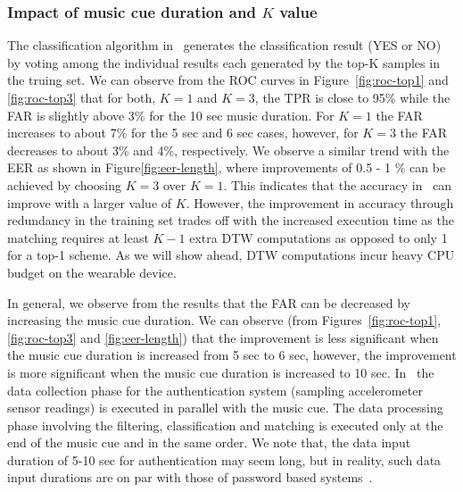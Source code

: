 \subsubsection{Impact of music cue duration and $K$ value}

The classification algorithm in \systemname~generates the classification result (YES or NO) by voting among the individual results each generated by the top-K samples in the truing set. We can observe from the ROC curves in Figure~\ref{fig:roc-top1} and \ref{fig:roc-top3} that 
for both, $K=1$ and $K=3$, the TPR is close to 95\% while the FAR is slightly 
above 3\% for the 10 sec music duration. For $K = 1$ the FAR increases to 
about 7\% for the 5 sec and 6 sec cases, however, for $K = 3$ the FAR 
decreases to about 3\% and 4\%, respectively. 
We observe a similar trend with the EER as shown in 
Figure\ref{fig:eer-length}, where improvements of 0.5 - 1 \% 
can be achieved by choosing $K = 3$ over $K = 1$.
This indicates that the accuracy in \systemname~can improve with a larger 
value of $K$. However, the improvement in accuracy through redundancy in the 
training set trades off with the increased execution time as the 
matching requires at least $K - 1$  extra DTW computations as opposed to only 
1 for a top-1 scheme. As we will show ahead, DTW computations incur heavy CPU 
budget on the wearable device. 

In general, we observe from the results that the FAR can 
be decreased by increasing the music cue duration. 
We can observe (from Figures~\ref{fig:roc-top1}, \ref{fig:roc-top3} and 
\ref{fig:eer-length}) that the improvement is less significant when the music 
cue duration is increased from 5 sec to 6 sec, however, the improvement is 
more 
significant when the music cue duration is increased to 10 sec. 
In \systemname~the data collection phase for the authentication system 
(sampling accelerometer sensor readings) is executed in parallel with the 
music cue. The data processing phase involving the filtering, classification 
and matching is executed only at the end of the music cue and in the same 
order.
We note that, the data input duration of 5-10 sec for authentication 
may seem long, but in reality, such data input durations are on par with those 
of password based systems~\cite{von2013patterns}.


